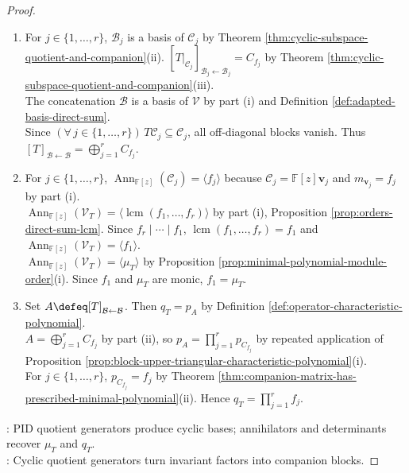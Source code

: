 \begin{theorem}
\begin{proof}
\begin{enumerate}[label=(\roman*)]
The annihilator of $\mathbf{e}_j$ is $\langle f_j\rangle$, so $\operatorname{ann}_T(\mathbf{v}_j)=\langle f_j\rangle$ by $\Psi$. Hence $m_{\mathbf{v}_j}=f_j$ by Definition \ref{def:vector-order-under-operator}.
\item For $j\in\{1,\ldots,r\}$, $\mathcal{B}_j$ is a basis of $\mathcal{C}_j$ by Theorem \ref{thm:cyclic-subspace-quotient-and-companion}(ii). $[T|_{\mathcal{C}_j}]_{\mathcal{B}_j\leftarrow\mathcal{B}_j}=C_{f_j}$ by Theorem \ref{thm:cyclic-subspace-quotient-and-companion}(iii).\\
The concatenation $\mathcal{B}$ is a basis of $\mathcal{V}$ by part (i) and Definition \ref{def:adapted-basis-direct-sum}.\\
Since $(\forall\,j\in\{1,\ldots,r\})\,T\mathcal{C}_j\subseteq\mathcal{C}_j$, all off-diagonal blocks vanish. Thus $[T]_{\mathcal{B}\leftarrow\mathcal{B}}=\bigoplus\limits_{j=1}^rC_{f_j}$.
\item For $j\in\{1,\ldots,r\}$, $\operatorname{Ann}_{\mathbb{F}[z]}(\mathcal{C}_j)=\langle f_j\rangle$ because $\mathcal{C}_j=\mathbb{F}[z]\mathbf{v}_j$ and $m_{\mathbf{v}_j}=f_j$ by part (i).\\
$\operatorname{Ann}_{\mathbb{F}[z]}(\mathcal{V}_T)=\langle\operatorname{lcm}(f_1,\ldots,f_r)\rangle$ by part (i), Proposition \ref{prop:orders-direct-sum-lcm}. Since $f_r\mid\cdots\mid f_1$, $\operatorname{lcm}(f_1,\ldots,f_r)=f_1$ and $\operatorname{Ann}_{\mathbb{F}[z]}(\mathcal{V}_T)=\langle f_1\rangle$.\\
$\operatorname{Ann}_{\mathbb{F}[z]}(\mathcal{V}_T)=\langle\mu_T\rangle$ by Proposition \ref{prop:minimal-polynomial-module-order}(i). Since $f_1$ and $\mu_T$ are monic, $f_1=\mu_T$.
\item Set $A\defeq[T]_{\mathcal{B}\leftarrow\mathcal{B}}$. Then $q_T=p_A$ by Definition \ref{def:operator-characteristic-polynomial}.\\
$A=\bigoplus\limits_{j=1}^rC_{f_j}$ by part (ii), so $p_A=\prod\limits_{j=1}^rp_{C_{f_j}}$ by repeated application of Proposition \ref{prop:block-upper-triangular-characteristic-polynomial}(i).\\
For $j\in\{1,\ldots,r\}$, $p_{C_{f_j}}=f_j$ by Theorem \ref{thm:companion-matrix-has-prescribed-minimal-polynomial}(ii). Hence $q_T=\prod\limits_{j=1}^rf_j$.
\end{enumerate}
: PID quotient generators produce cyclic bases; annihilators and determinants recover $\mu_T$ and $q_T$.\\
: Cyclic quotient generators turn invariant factors into companion blocks.
\end{proof}
\end{theorem}
